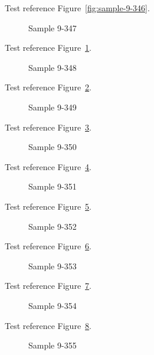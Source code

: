Test reference Figure~\ref{fig:sample-9-346}.

\begin{figure}[tbhp]
\caption{Sample 9-347}
\label{fig:sample-9-347}
\end{figure}

Test reference Figure~\ref{fig:sample-9-347}.

\begin{figure}[tbhp]
\caption{Sample 9-348}
\label{fig:sample-9-348}
\end{figure}

Test reference Figure~\ref{fig:sample-9-348}.

\begin{figure}[tbhp]
\caption{Sample 9-349}
\label{fig:sample-9-349}
\end{figure}

Test reference Figure~\ref{fig:sample-9-349}.

\begin{figure}[tbhp]
\caption{Sample 9-350}
\label{fig:sample-9-350}
\end{figure}

Test reference Figure~\ref{fig:sample-9-350}.

\begin{figure}[tbhp]
\caption{Sample 9-351}
\label{fig:sample-9-351}
\end{figure}

Test reference Figure~\ref{fig:sample-9-351}.

\begin{figure}[tbhp]
\caption{Sample 9-352}
\label{fig:sample-9-352}
\end{figure}

Test reference Figure~\ref{fig:sample-9-352}.

\begin{figure}[tbhp]
\caption{Sample 9-353}
\label{fig:sample-9-353}
\end{figure}

Test reference Figure~\ref{fig:sample-9-353}.

\begin{figure}[tbhp]
\caption{Sample 9-354}
\label{fig:sample-9-354}
\end{figure}

Test reference Figure~\ref{fig:sample-9-354}.

\begin{figure}[tbhp]
\caption{Sample 9-355}
\label{fig:sample-9-355}
\end{figure}

